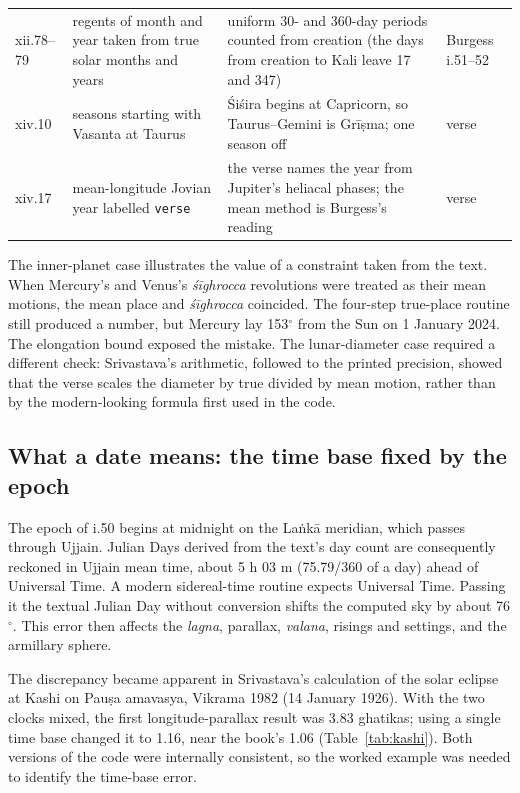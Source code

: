 \documentclass[11pt,a4paper]{article}
\begin{document}
\begin{table}[ht]
\begin{tabularx}{\textwidth}{@{}l L L L@{}}
xii.78--79 & regents of month and year taken from true solar months and years & uniform 30- and 360-day periods counted from creation (the days from creation to Kali leave 17 and 347) & Burgess i.51--52 \\
xiv.10 & seasons starting with Vasanta at Taurus & \'Si\'sira begins at Capricorn, so Taurus--Gemini is Gr\=i\d{s}ma; one season off & verse \\
xiv.17 & mean-longitude Jovian year labelled \texttt{verse} & the verse names the year from Jupiter's heliacal phases; the mean method is Burgess's reading & verse \\
\bottomrule
\end{tabularx}
\end{table}

The inner-planet case illustrates the value of a constraint taken from the text. When Mercury's and Venus's \textit{\'{s}\={i}ghrocca} revolutions were treated as their mean motions, the mean place and \textit{\'{s}\={i}ghrocca} coincided. The four-step true-place routine still produced a number, but Mercury lay 153$^\circ$ from the Sun on 1 January 2024. The elongation bound exposed the mistake. The lunar-diameter case required a different check: Srivastava's arithmetic, followed to the printed precision, showed that the verse scales the diameter by true divided by mean motion, rather than by the modern-looking formula first used in the code.

\subsection{What a date means: the time base fixed by the epoch}
\label{sec:timebase}

The epoch of i.50 begins at midnight on the La\.{n}k\={a} meridian, which passes through Ujjain. Julian Days derived from the text's day count are consequently reckoned in Ujjain mean time, about 5 h 03 m (75.79/360 of a day) ahead of Universal Time. A modern sidereal-time routine expects Universal Time. Passing it the textual Julian Day without conversion shifts the computed sky by about 76$^\circ$. This error then affects the \textit{lagna}, parallax, \textit{valana}, risings and settings, and the armillary sphere.

The discrepancy became apparent in Srivastava's calculation of the solar eclipse at Kashi on Pau\d{s}a amavasya, Vikrama 1982 (14 January 1926). With the two clocks mixed, the first longitude-parallax result was 3.83 ghatikas; using a single time base changed it to 1.16, near the book's 1.06 (Table~\ref{tab:kashi}). Both versions of the code were internally consistent, so the worked example was needed to identify the time-base error.
\end{document}
